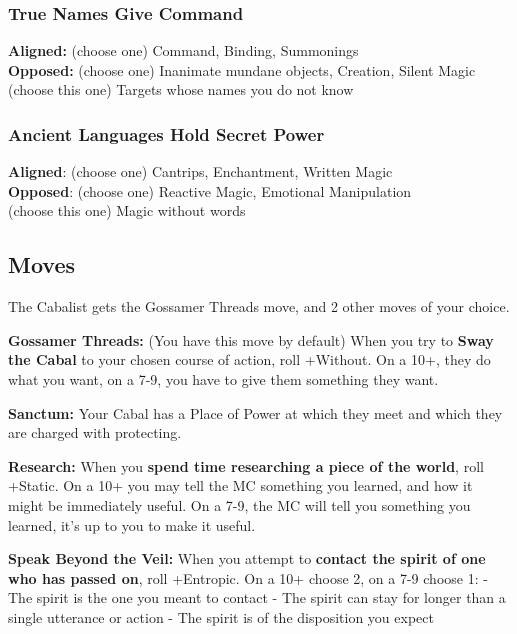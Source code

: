 \documentclass[
  oneside,
  statementpaper,
  9pt]{memoir}
\begin{document}
\hypertarget{true-names-give-command}{%
\subsubsection{True Names Give Command}\label{true-names-give-command}}

\textbf{Aligned:} (choose one) Command, Binding, Summonings\\
\textbf{Opposed:} (choose one) Inanimate mundane objects, Creation,
Silent Magic\\
(choose this one) Targets whose names you do not know

\hypertarget{ancient-languages-hold-secret-power}{%
\subsubsection{Ancient Languages Hold Secret
Power}\label{ancient-languages-hold-secret-power}}

\textbf{Aligned}: (choose one) Cantrips, Enchantment, Written Magic\\
\textbf{Opposed}: (choose one) Reactive Magic, Emotional Manipulation\\
(choose this one) Magic without words

\hypertarget{moves}{%
\subsection{Moves}\label{moves}}

The Cabalist gets the Gossamer Threads move, and 2 other moves of your
choice.

\textbf{Gossamer Threads:} (You have this move by default) When you try
to \textbf{Sway the Cabal} to your chosen course of action, roll
+Without. On a 10+, they do what you want, on a 7-9, you have to give
them something they want.

\textbf{Sanctum:} Your Cabal has a Place of Power at which they meet and
which they are charged with protecting.

\textbf{Research:} When you \textbf{spend time researching a piece of
the world}, roll +Static. On a 10+ you may tell the MC something you
learned, and how it might be immediately useful. On a 7-9, the MC will
tell you something you learned, it's up to you to make it useful.

\textbf{Speak Beyond the Veil:} When you attempt to \textbf{contact the
spirit of one who has passed on}, roll +Entropic. On a 10+ choose 2, on
a 7-9 choose 1: - The spirit is the one you meant to contact - The
spirit can stay for longer than a single utterance or action - The
spirit is of the disposition you expect
\end{document}
